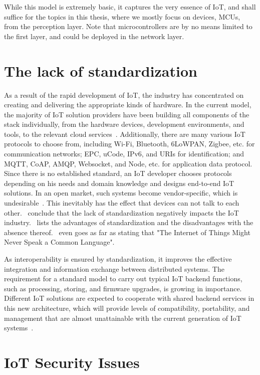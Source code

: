 While this model is extremely basic, it captures the very essence of IoT, and shall suffice for the topics in this thesis, where we mostly focus on devices, MCUs, from the perception layer. Note that microcontrollers are by no means limited to the first layer, and could be deployed in the network layer.


\section{The lack of standardization}
As a result of the rapid development of IoT, the industry has concentrated on creating and delivering the appropriate kinds of hardware. In the current model, the majority of IoT solution providers have been building all components of the stack individually, from the hardware devices, development environments, and tools, to the relevant cloud services~\cite{banafa2016iot}. Additionally, there are many various IoT protocols to choose from, including Wi-Fi, Bluetooth, 6LoWPAN, Zigbee, etc. for communication networks; EPC, uCode, IPv6, and URIs for identification; and MQTT, CoAP, AMQP, Websocket, and Node, etc. for application data protocol. Since there is no established standard, an IoT developer chooses protocols depending on his needs and domain knowledge and designs end-to-end IoT solutions. In an open market, such systems become vendor-specific, which is undesirable~\cite{kafle2016internet}. This inevitably has the effect that devices can not talk to each other.~\cite{al2016iot} conclude that the lack of standardization negatively impacts the IoT industry.~\cite{kafle2016internet} lists the advantages of standardization and the disadvantages with the absence thereof.~\cite{newman2016internet} even goes as far as stating that "The Internet of Things Might Never Speak a Common Language".

As interoperability is ensured by standardization, it improves the effective integration and information exchange between distributed systems. The requirement for a standard model to carry out typical IoT backend functions, such as processing, storing, and firmware upgrades, is growing in importance. Different IoT solutions are expected to cooperate with shared backend services in this new architecture, which will provide levels of compatibility, portability, and management that are almost unattainable with the current generation of IoT systems~\cite{banafa2016iot}.

\section{IoT Security Issues}

